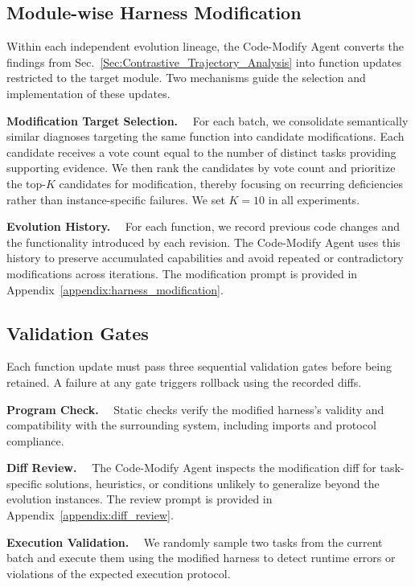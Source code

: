 \documentclass{article} %
\begin{document}
\subsection{Module-wise Harness Modification}
\label{sebsection_harness_evolution}

Within each independent evolution lineage, the Code-Modify Agent converts the findings from Sec.~\ref{Sec:Contrastive_Trajectory_Analysis} into function updates restricted to the target module.
Two mechanisms guide the selection and implementation of these updates.

\noindent\textbf{Modification Target Selection.}~~
For each batch, we consolidate semantically similar diagnoses targeting the same function into candidate modifications. Each candidate receives a vote count equal to the number of distinct tasks providing supporting evidence. We then rank the candidates by vote count and prioritize the top-\(K\) candidates for modification, thereby focusing on recurring deficiencies rather than instance-specific failures. We set \(K=10\) in all experiments.


\noindent\textbf{Evolution History.}~~
For each function, we record previous code changes and the functionality introduced by each revision.
The Code-Modify Agent uses this history to preserve accumulated capabilities and avoid repeated or contradictory modifications across iterations.
The modification prompt is provided in Appendix~\ref{appendix:harness_modification}.


\subsection{Validation Gates}
\label{subsec:validation_gates}

Each function update must pass three sequential validation gates before being retained.
A failure at any gate triggers rollback using the recorded diffs.

\noindent\textbf{Program Check.}~~
Static checks verify the modified harness's validity and compatibility with the surrounding system, including imports and protocol compliance.

\noindent\textbf{Diff Review.}~~
The Code-Modify Agent inspects the modification diff for task-specific solutions, heuristics, or conditions unlikely to generalize beyond the evolution instances.
The review prompt is provided in Appendix~\ref{appendix:diff_review}.

\noindent\textbf{Execution Validation.}~~
We randomly sample two tasks from the current batch and execute them using the modified harness to detect runtime errors or violations of the expected execution protocol.
\end{document}
